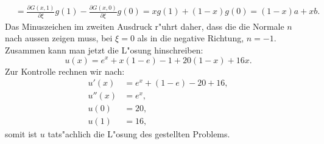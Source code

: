\begin{loesung}
\begin{align*}
&=
\frac{\partial G(x,1)}{\partial\xi} g(1)
-
\frac{\partial G(x,0)}{\partial\xi} g(0)
=
xg(1) + (1-x)g(0)
=
(1-x)a
+
xb.
\end{align*}
Das Minuszeichen im zweiten Ausdruck r"uhrt daher, dass die die Normale $n$
nach aussen zeigen muss, bei $\xi=0$ als in die negative Richtung, $n=-1$.
Zusammen kann man jetzt die L"osung hinschreiben:
\[
u(x)
=
e^x+x(1-e)-1
+20(1-x)+16x.
\]
Zur Kontrolle rechnen wir nach:
\begin{align*}
u'(x)
&=
e^x+(1-e)-20+16,
\\
u''(x)
&=
e^x,
\\
u(0)
&=
20,
\\
u(1)
&=
16,
\end{align*}
somit ist $u$ tats"achlich die L"osung des gestellten Problems.
\end{loesung}


